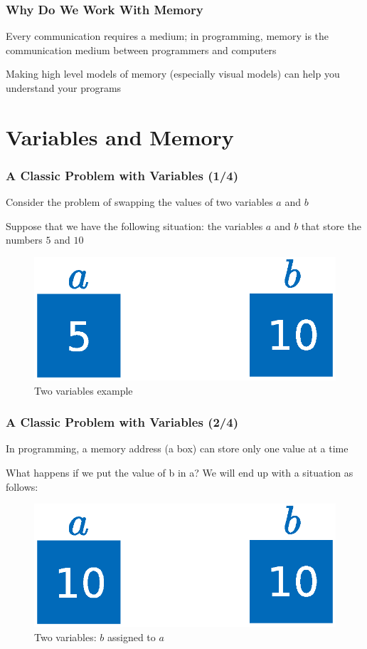 \documentclass{beamer}
\begin{document}
\begin{frame}
\frametitle{Why Do We Work With Memory}
    Every communication requires a medium; in programming, memory is the communication medium between programmers and computers
    \newline

    Making high level models of memory (especially visual models) can help you understand your programs
\end{frame}

\section{Variables and Memory}

\begin{frame}
\frametitle{A Classic Problem with Variables (1/4)}
    Consider the problem of swapping the values of two variables $a$ and $b$
    \newline

    Suppose that we have the following situation: the variables $a$ and $b$ that store the numbers $5$ and $10$

    \begin{figure}[H]
        \centering
        \includegraphics[scale=0.5]{figures/two_variables_example/example.eps}
        \caption{Two variables example}
    \end{figure}
\end{frame}

\begin{frame}
\frametitle{A Classic Problem with Variables (2/4)}
    In programming, a memory address (a box) can store only one value at a time
    \newline

    What happens if we put the value of b in a? We will end up with a situation as follows:
    \begin{figure}[H]
        \centering
        \includegraphics[scale=0.5]{figures/two_variables_example/assignment.eps}
        \caption{Two variables: $b$ assigned to $a$}
    \end{figure}
\end{frame}
\end{document}
